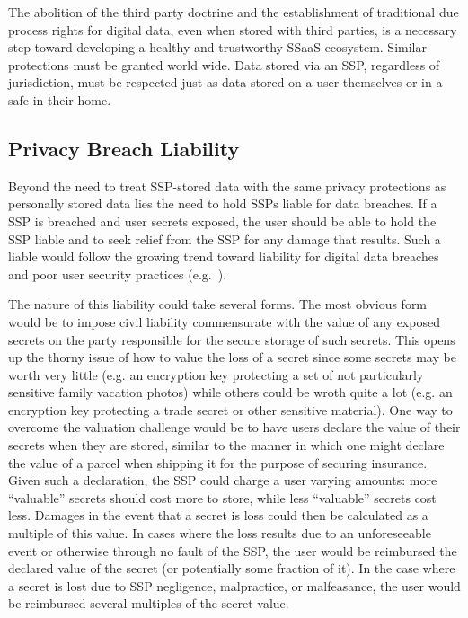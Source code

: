 The abolition of the third party doctrine and the establishment of
traditional due process rights for digital data, even when stored with
third parties, is a necessary step toward developing a healthy and
trustworthy SSaaS ecosystem. Similar protections must be granted world
wide. Data stored via an SSP, regardless of jurisdiction, must be
respected just as data stored on a user themselves or in a safe in
their home.

\subsection{Privacy Breach Liability}

Beyond the need to treat SSP-stored data with the same privacy
protections as personally stored data lies the need to hold SSPs
liable for data breaches. If a SSP is breached and user secrets
exposed, the user should be able to hold the SSP liable and to seek
relief from the SSP for any damage that results. Such a liable would
follow the growing trend toward liability for digital data breaches
and poor user security practices (e.g.~\cite{ftc-asus}).

The nature of this liability could take several forms. The most
obvious form would be to impose civil liability commensurate with the
value of any exposed secrets on the party responsible for the secure
storage of such secrets. This opens up the thorny issue of how to
value the loss of a secret since some secrets may be worth very little
(e.g. an encryption key protecting a set of not particularly sensitive
family vacation photos) while others could be wroth quite a lot
(e.g. an encryption key protecting a trade secret or other sensitive
material). One way to overcome the valuation challenge would be to
have users declare the value of their secrets when they are stored,
similar to the manner in which one might declare the value of a parcel
when shipping it for the purpose of securing insurance. Given such a
declaration, the SSP could charge a user varying amounts: more
``valuable'' secrets should cost more to store, while less
``valuable'' secrets cost less. Damages in the event that a secret is
loss could then be calculated as a multiple of this value. In cases
where the loss results due to an unforeseeable event or otherwise
through no fault of the SSP, the user would be reimbursed the declared
value of the secret (or potentially some fraction of it). In the case
where a secret is lost due to SSP negligence, malpractice, or
malfeasance, the user would be reimbursed several multiples of the
secret value.

